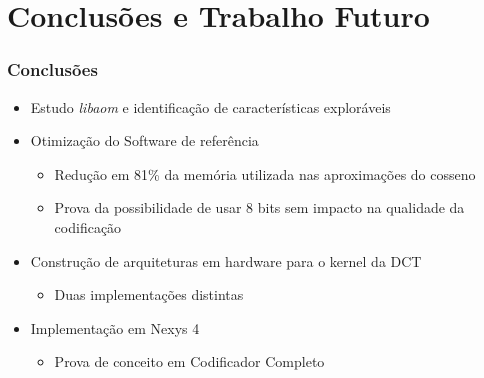 \documentclass{beamer}
\begin{document}

\section{Conclusões e Trabalho Futuro}

\note{
       \begin{itemize}[label=$\bullet$]
              \item
       \end{itemize}
}

\begin{frame}
       \frametitle{Conclusões}
       \begin{itemize}
              \item[\ding{51}] Estudo \emph{libaom} e identificação de características exploráveis
              \item[\ding{51}] Otimização do Software de referência
              \begin{itemize}[label=$\bullet$]
                     \item Redução em 81\% da memória utilizada nas aproximações do cosseno
                     \item Prova da possibilidade de usar 8 bits sem impacto na qualidade da codificação
              \end{itemize} 
              \item[\ding{51}] Construção de arquiteturas em hardware para o kernel da DCT
              \begin{itemize}[label=$\bullet$]
                     \item Duas implementações distintas
              \end{itemize} 
              \item[\ding{51}] Implementação em Nexys 4
              \begin{itemize}[label=$\bullet$]
                     \item Prova de conceito em Codificador Completo
              \end{itemize} 
       \end{itemize}
\end{frame}
\end{document}
